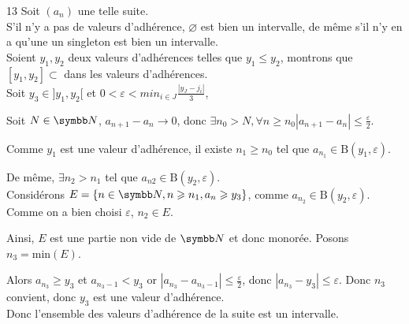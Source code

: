 \begin{correction}{13}
    Soit $(a_n)$ une telle suite.\\

    S'il n'y a pas de valeurs d'adhérence, $\varnothing$ est bien un intervalle, de même s'il n'y en a qu'une un singleton est bien un intervalle.\\

    Soient $y_1,y_2$ deux valeurs d'adhérences telles que $y_1 \leqslant y_2$, montrons que $[y_1,y_2] \subset$ dans les valeurs d'adhérences.\\

    Soit $y_3 \in ]y_1, y_2[$ et $0 < \varepsilon < min_{i \in J}\frac{|y_J - j_i|}{3}$,

    Soit $N \in \N$, $a_{n+1} - a_n \rightarrow 0$, donc $\exists n_0 > N, \forall n \geqslant n_0 |a_{n+1} - a_n| \leqslant \frac\varepsilon2$.

    Comme $y_1$ est une valeur d'adhérence, il existe $n_1 \geqslant n_0$ tel que $a_{n_1} \in \text{B}(y_1, \varepsilon)$.

    De même, $\exists n_2 > n_1$ tel que $a_{n2} \in \text{B}(y_2, \varepsilon)$.\\

    Considérons $E = \{n \in \N, n \geqslant n_1, a_n \geqslant y_3\}$, comme $a_{n_2} \in \text{B}(y_2,\varepsilon)$. Comme on a bien choisi $\varepsilon$, $n_2 \in E$.

    Ainsi, $E$ est une partie non vide de $\N$ et donc monorée. Posons $n_3 = \text{min}(E)$.

    Alors $a_{n_3} \geqslant y_3$ et $a_{n_3 - 1} < y_3$ or $|a_{n_3} - a_{n_3 - 1}| \leqslant \frac\varepsilon2$, donc $|a_{n_3} - y_3| \leqslant \varepsilon$. Donc $n_3$ convient, donc $y_3$ est une valeur d'adhérence.\\

    Donc l'ensemble des valeurs d'adhérence de la suite est un intervalle. 
\end{correction}

